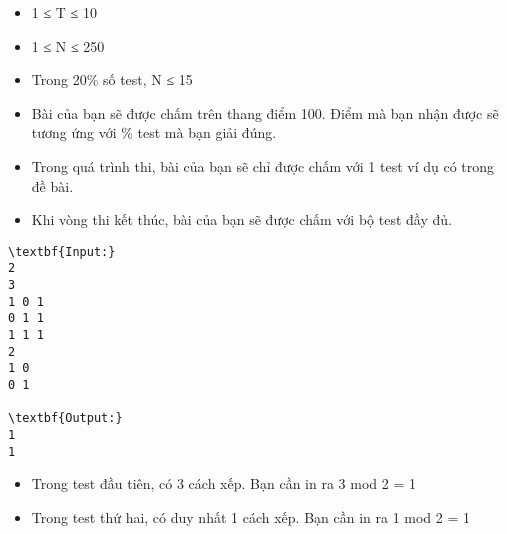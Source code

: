 \begin{itemize}
	\item     1 ≤ T ≤ 10   
	\item     1 ≤ N ≤ 250   
	\item     Trong 20\% số test, N ≤ 15   
\end{itemize}
\begin{itemize}
	\item     Bài của bạn sẽ được chấm trên thang điểm 100. Điểm mà bạn nhận được sẽ tương ứng với \% test mà bạn giải đúng.   
	\item     Trong quá trình thi, bài của bạn sẽ chỉ được chấm với 1 test ví dụ có trong đề bài.   
	\item     Khi vòng thi kết thúc, bài của bạn sẽ được chấm với bộ test đầy đủ.   
\end{itemize}
\begin{itemize}
\end{itemize}
\begin{verbatim}
\textbf{Input:}
2
3
1 0 1
0 1 1
1 1 1
2
1 0
0 1

\textbf{Output:}
1
1
\end{verbatim}
\begin{itemize}
	\item     Trong test đầu tiên, có 3 cách xếp. Bạn cần in ra 3 mod 2 = 1   
	\item     Trong test thứ hai, có duy nhất 1 cách xếp. Bạn cần in ra 1 mod 2 = 1   
\end{itemize}